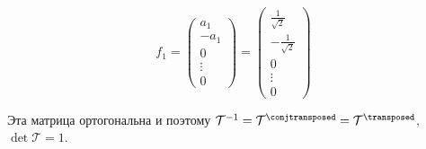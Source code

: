 \begin{propose}
    \[
             f_1
             = \begin{pmatrix}a_1 \\ -a_1 \\ 0 \\ \vdots \\ 0 \end{pmatrix}
             = \begin{pmatrix}\frac1{\sqrt2} \\ - \frac{1}{\sqrt2} \\ 0 \\ \vdots \\ 0 \end{pmatrix}
             \]

    Эта матрица ортогональна и поэтому
    \( \mathcal T^{-1} = \mathcal T^\conjtransposed = \mathcal T^\transposed \),
    \( \det\mathcal T = 1 \).
\end{propose}
